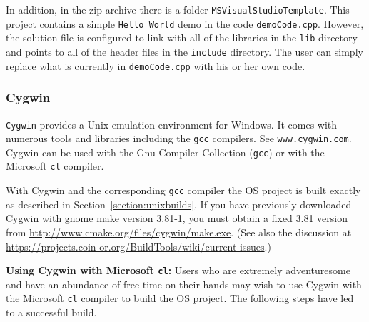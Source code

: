 \documentclass[11pt]{article}
\renewcommand{\_}{{\char"5F}}
\renewcommand{\{}{{\char"7B}}
\renewcommand{\}}{{\char"7D}}
\renewcommand{\^}{{\char"0D}}
\renewcommand{\'}{{\char"0D}}
\begin{document}
In addition, in the zip archive there is a folder {\tt MSVisualStudioTemplate}. This project contains a simple 
{\tt Hello World} demo in the code {\tt demoCode.cpp}. However, the solution file is configured to link with all 
of the libraries in the {\tt lib} directory and points to all of the header files in the {\tt include} directory. 
The user can simply replace what is currently in {\tt demoCode.cpp} with his or her own code. 





\subsubsection{Cygwin}\label{section:cygwin}

{\tt Cygwin} provides a Unix emulation environment for Windows. It comes with numerous tools and libraries including the {\tt gcc} compilers. See {\tt www.cygwin.com}.   Cygwin can be used with the Gnu Compiler Collection ({\tt gcc}) or with the Microsoft {\tt cl} compiler.

\vskip 8pt

  With Cygwin and the corresponding {\tt gcc} compiler the OS project is  
built exactly as described in Section~\ref{section:unixbuilds}. If you have previously downloaded 
Cygwin with gnome make version 3.81-1,  you must obtain a fixed 3.81 version from \url{http://www.cmake.org/files/cygwin/make.exe}. 
(See also    %
the discussion at \url{https://projects.coin-or.org/BuildTools/wiki/current-issues}.)


\vskip 8pt

{\bf Using Cygwin with Microsoft {\tt cl}:}   Users who are extremely adventuresome and have an abundance  of free time on their hands may wish to use Cygwin with the Microsoft {\tt cl} compiler to build the OS project.   The following steps have led to a successful build.
\end{document}
